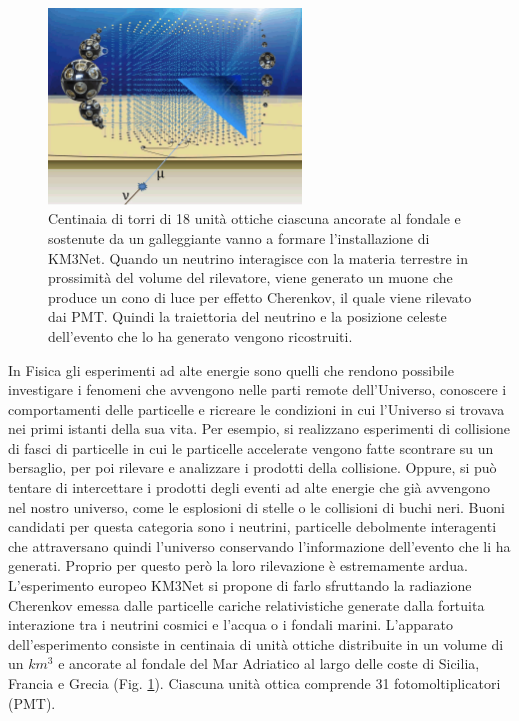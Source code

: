 \documentclass[../main.tex]{subfiles}
\begin{document}
\begin{figure}[!b]
    \centering
    \includegraphics[width=0.6\textwidth]{KM3NetTowers.png}
    \caption{\small Centinaia di torri di 18 unità ottiche ciascuna ancorate al fondale e sostenute da un galleggiante vanno a formare l'installazione di KM3Net. Quando un neutrino interagisce con la materia terrestre in prossimità del volume del rilevatore, viene generato un muone che produce un cono di luce per effetto Cherenkov, il quale viene rilevato dai PMT. Quindi la traiettoria del neutrino e la posizione celeste dell'evento che lo ha generato vengono ricostruiti.} \label{fig:towers}
\end{figure}
In Fisica gli esperimenti ad alte energie sono quelli che rendono possibile investigare i fenomeni che avvengono nelle parti remote dell'Universo, conoscere i comportamenti delle particelle e ricreare le condizioni in cui l'Universo si trovava nei primi istanti della sua vita. Per esempio, si realizzano esperimenti di collisione di fasci di particelle in cui le particelle accelerate vengono fatte scontrare su un bersaglio, per poi rilevare e analizzare i prodotti della collisione. Oppure, si può tentare di intercettare i prodotti degli eventi ad alte energie che già avvengono nel nostro universo, come le esplosioni di stelle o le collisioni di buchi neri. Buoni candidati per questa categoria sono i neutrini, particelle debolmente interagenti che attraversano quindi l'universo conservando l'informazione dell'evento che li ha generati. Proprio per questo però la loro rilevazione è estremamente ardua. L'esperimento europeo KM3Net si propone di farlo sfruttando la radiazione Cherenkov emessa dalle particelle cariche relativistiche generate dalla fortuita interazione tra i neutrini cosmici e l'acqua o i fondali marini. L'apparato dell'esperimento consiste in centinaia di unità ottiche distribuite in un volume di un $km^3$ e ancorate al fondale del Mar Adriatico al largo delle coste di Sicilia, Francia e Grecia (Fig. \ref{fig:towers}). Ciascuna unità ottica comprende 31 fotomoltiplicatori (PMT). 
\end{document}
